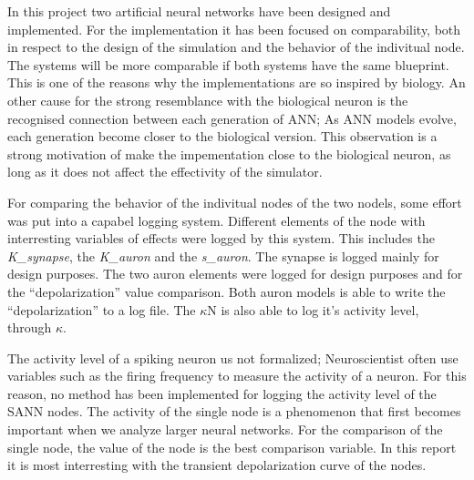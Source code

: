 


In this project two artificial neural networks have been designed and implemented. 
For the implementation it has been focused on comparability, both in respect to the design of the simulation and the behavior of the indivitual node.
The systems will be more comparable if both systems have the same blueprint. 
This is one of the reasons why the implementations are so inspired by biology.
An other cause for the strong resemblance with the biological neuron is the recognised connection between each generation of ANN; As ANN models evolve, each generation become closer to the biological version. %
This observation is a strong motivation of make the impementation close to the biological neuron, as long as it does not affect the effectivity of the simulator. %

For comparing the behavior of the indivitual nodes of the two nodels, some effort was put into a capabel logging system. 
Different elements of the node with interresting variables of effects were logged by this system. This includes the \emph{K\_synapse}, the \emph{K\_auron} and the \emph{s\_auron}.
The synapse is logged mainly for design purposes. The two auron elements were logged for design purposes and for the ``depolarization'' value comparison.
Both auron models is able to write the ``depolarization'' to a log file. The $\kappa$N is also able to log it's activity level, through $\kappa$.

The activity level of a spiking neuron us not formalized; Neuroscientist often use variables such as the firing frequency to measure the activity of a neuron.
For this reason, no method has been implemented for logging the activity level of the SANN nodes.
The activity of the single node is a phenomenon that first becomes important when we analyze larger neural networks.
For the comparison of the single node, the value of the node is the best comparison variable. 
In this report it is most interresting with the transient depolarization curve of the nodes.




